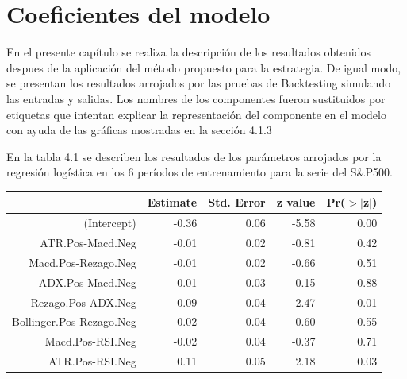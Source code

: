 \documentclass[a4paper,12pt]{Latex/Classes/PhDthesisPSnPDF}
\begin{document}


\newpage

\section{Coeficientes del modelo}

En el presente capítulo se realiza la descripción de los resultados obtenidos despues de la aplicación del método propuesto para la estrategia. De igual modo, se presentan los resultados arrojados por las pruebas de Backtesting simulando las entradas y salidas. Los nombres de los componentes fueron sustituidos por etiquetas que intentan explicar la representación del componente en el modelo con ayuda de las gráficas mostradas en la sección 4.1.3


En la tabla 4.1 se describen los resultados de los parámetros arrojados por la regresión logística en los 6 períodos de entrenamiento para la serie del S\&P500.

\begin{center}
\begin{table}[ht]
\centering
\begin{tabular}{rrrrr}
  \hline
 & Estimate & Std. Error & z value & Pr($>$$|$z$|$) \\ 
  \hline
(Intercept) & -0.36 & 0.06 & -5.58 & 0.00 \\ 
  ATR.Pos-Macd.Neg & -0.01 & 0.02 & -0.81 & 0.42 \\ 
  Macd.Pos-Rezago.Neg & -0.01 & 0.02 & -0.66 & 0.51 \\ 
  ADX.Pos-Macd.Neg & 0.01 & 0.03 & 0.15 & 0.88 \\ 
  Rezago.Pos-ADX.Neg & 0.09 & 0.04 & 2.47 & 0.01 \\ 
  Bollinger.Pos-Rezago.Neg & -0.02 & 0.04 & -0.60 & 0.55 \\ 
  Macd.Pos-RSI.Neg & -0.02 & 0.04 & -0.37 & 0.71 \\ 
  ATR.Pos-RSI.Neg & 0.11 & 0.05 & 2.18 & 0.03 \\ 
   \hline
\end{tabular}
\end{table}\end{center}
\end{document}
